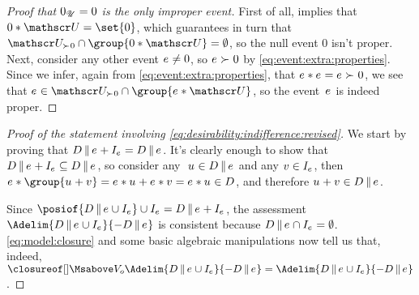 \documentclass[preprint]{isipta2025}
\begin{document}
\begin{proof}[Proof that \(0_{\mathscr{U}}=0\) is the only improper event]
First of all,  implies that \(0\ast\opts=\set{0}\), which guarantees in turn that \(\posopts\cap\group{0\ast\opts}=\emptyset\), so the null event \(0\) isn't proper.
Next, consider any other event \(e_{}\neq0\), so \(e_{}\mathrel{\succ_{}}0\) by \cref{eq:event:extra:properties}.
Since we infer, again from \cref{eq:event:extra:properties}, that \(e_{}\ast e_{}=e_{}\mathrel{\succ_{}}0\), we see that \(\eventopt\in\posopts\cap\group{\calledoff{\opts}}\), so the event~\(e_{}\) is indeed proper.
\end{proof}

\begin{proof}[Proof of the statement involving \cref{eq:desirability:indifference:revised}]
We start by proving that \(\desirset\altcondon\eventopt+\eventindifset=\desirset\altcondon\eventopt\).
It's clearly enough to show that \(\desirset\altcondon\eventopt+\eventindifset\subseteq\desirset\altcondon\eventopt\), so consider any \(\
\opt\in\desirset\altcondon\eventopt\) and any \(v_{}\in I_{{e_{}}}\), then \(\eventopt\ast\group{\opt+\altopt}=\eventopt\ast\opt+\eventopt\ast\altopt=\eventopt\ast\opt\in\desirset\), and therefore \(\opt+\altopt\in\desirset\altcondon\eventopt\).

Since \(\posiof{\desirset\altcondon\eventopt\cup\eventindifset}\cup\eventindifset=\desirset\altcondon\eventopt+\eventindifset\), the assessment \(\Adelim{\desirset\altcondon\eventopt\cup\eventindifset}{-\desirset\altcondon\eventopt}\) is consistent because \(\desirset\altcondon\eventopt\cap\eventindifset=\emptyset\).
\cref{eq:model:closure} and some basic algebraic manipulations now tell us that, indeed, \(\Mclsbgof{\zeroM}{\Adelim{\desirset\altcondon\eventopt\cup\eventindifset}{-\desirset\altcondon\eventopt}}=\Adelim{\desirset\altcondon\eventopt\cup\eventindifset}{-\desirset\altcondon\eventopt}\).
\end{proof}
\end{document}
